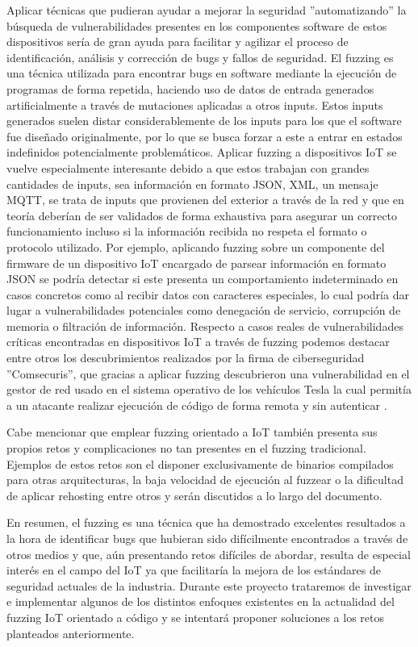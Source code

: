 Aplicar técnicas que pudieran ayudar a mejorar la seguridad ''automatizando'' la búsqueda de vulnerabilidades presentes en los componentes software 
de estos dispositivos sería de gran ayuda para facilitar y agilizar el proceso de identificación, análisis y corrección 
de bugs y fallos de seguridad. El fuzzing es una técnica utilizada para encontrar bugs en software mediante la ejecución de 
programas de forma repetida, haciendo uso de datos de entrada generados artificialmente a través de mutaciones aplicadas a otros
inputs. Estos inputs generados suelen distar considerablemente de los inputs para los que el software fue diseñado 
originalmente, por lo que se busca forzar a este a entrar en estados indefinidos potencialmente problemáticos. Aplicar
fuzzing a dispositivos IoT se vuelve especialmente interesante debido a que estos trabajan con grandes cantidades de inputs,
sea información en formato JSON, XML, un mensaje MQTT, se trata de inputs que provienen del exterior a través de la red y que en teoría deberían de ser validados 
de forma exhaustiva para asegurar un correcto funcionamiento incluso si la información recibida no respeta el formato o protocolo 
utilizado. Por ejemplo, aplicando fuzzing sobre un componente del firmware de un dispositivo IoT encargado de parsear información en formato JSON
se podría detectar si este presenta un comportamiento indeterminado en casos concretos como al recibir datos con caracteres especiales, lo cual
podría dar lugar a vulnerabilidades potenciales como denegación de servicio, corrupción de memoria o filtración de información. Respecto a casos reales
de vulnerabilidades críticas encontradas en dispositivos IoT a través de fuzzing podemos destacar entre otros los descubrimientos realizados por la firma 
de ciberseguridad ''Comsecuris'', que gracias a aplicar fuzzing descubrieron una vulnerabilidad en el gestor de red usado en el 
sistema operativo de los vehículos Tesla la cual permitía a un atacante realizar ejecución de código de forma remota y sin autenticar \cite{TeslaMCU}.

Cabe mencionar que emplear fuzzing orientado a IoT también presenta sus propios retos y complicaciones no tan presentes en el fuzzing tradicional. 
Ejemplos de estos retos son el disponer exclusivamente de binarios compilados para otras arquitecturas, la baja velocidad de ejecución al fuzzear o la 
dificultad de aplicar rehosting entre otros y serán discutidos a lo largo del documento.\bigskip

En resumen, el fuzzing es una técnica que ha demostrado excelentes resultados a la hora de identificar bugs 
que hubieran sido difícilmente encontrados a través de otros medios y que, aún presentando retos difíciles de abordar, resulta de especial interés en
el campo del IoT ya que facilitaría la mejora de los estándares de seguridad actuales de la industria. Durante este proyecto trataremos de investigar
e implementar algunos de los distintos enfoques existentes en la actualidad del fuzzing IoT orientado a código y se intentará proponer 
soluciones a los retos planteados anteriormente.


